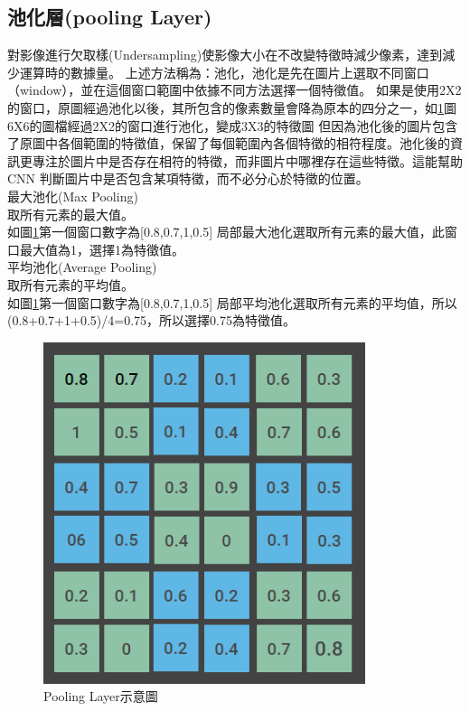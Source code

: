 \subsection{池化層(pooling Layer)}
對影像進行欠取樣(Undersampling)使影像大小在不改變特徵時減少像素，達到減少運算時的數據量。
上述方法稱為：池化，池化是先在圖片上選取不同窗口（window），並在這個窗口範圍中依據不同方法選擇一個特徵值。
如果是使用2X2的窗口，原圖經過池化以後，其所包含的像素數量會降為原本的四分之一，如\ref{fig:Pooling Layer}圖6X6的圖檔經過2X2的窗口進行池化，變成3X3的特徵圖
但因為池化後的圖片包含了原圖中各個範圍的特徵值，保留了每個範圍內各個特徵的相符程度。池化後的資訊更專注於圖片中是否存在相符的特徵，而非圖片中哪裡存在這些特徵。這能幫助 CNN 判斷圖片中是否包含某項特徵，而不必分心於特徵的位置。\\
最大池化(Max Pooling)\\
取所有元素的最大值。\\
如圖\ref{fig:Pooling Layer}第一個窗口數字為[0.8,0.7,1,0.5] 局部最大池化選取所有元素的最大值，此窗口最大值為1，選擇1為特徵值。\\
平均池化(Average Pooling)\\
取所有元素的平均值。\\
如圖\ref{fig:Pooling Layer}第一個窗口數字為[0.8,0.7,1,0.5] 局部平均池化選取所有元素的平均值，所以(0.8+0.7+1+0.5)/4=0.75，所以選擇0.75為特徵值。\\
\begin{figure}[H]
	\centerline{\includegraphics[height=10cm]{pic/pooling 1.PNG}}

	\caption{Pooling Layer示意圖}
	\label{fig:Pooling Layer}
\end{figure}
